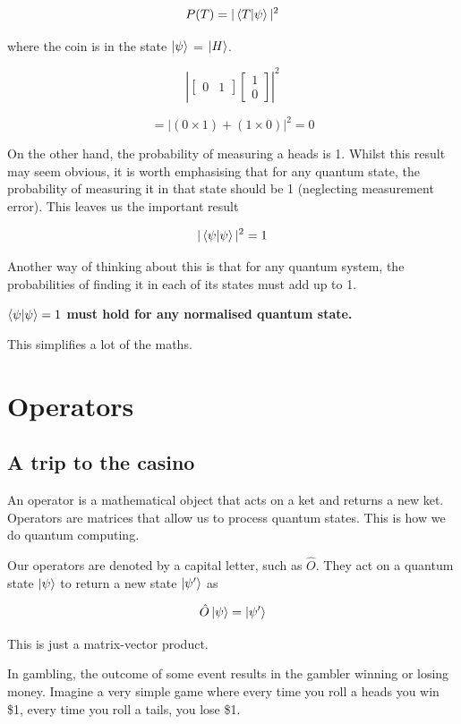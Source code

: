 \documentclass{book}
\begin{document}
$$ P(T) = |\braket{T|\psi}|^2 $$ 

where the coin is in the state $\ket{\psi}$ = $\ket{H}$. 

$$  
\left| \begin{bmatrix} 0 & 1 \end{bmatrix} \begin{bmatrix} 1 \\ 0 \end{bmatrix} \right|^2 
$$

$$
= \left| (0 \times 1) + (1 \times 0) \right|^2 = 0 
$$

On the other hand, the probability of measuring a heads is 1. Whilst this result may seem obvious, it is worth emphasising that for any quantum state, the probability of measuring it in that state should be 1 (neglecting measurement error). This leaves us the important result

$$ |\braket{\psi|\psi}|^2 = 1 $$

Another way of thinking about this is that for any quantum system, the probabilities of finding it in each of its states must add up to 1. 

\textbf{$ \braket{\psi|\psi} = 1 $ must hold for any normalised quantum state.}

This simplifies a lot of the maths. 

\section{ Operators }

\subsection{ A trip to the casino}

An operator is a mathematical object that acts on a ket and returns a new ket. Operators are matrices that allow us to process quantum states. This is how we do quantum computing. 

Our operators are denoted by a capital letter, such as  $\hat{O}$. They act on a quantum state $\ket{\psi}$ to return a new state $\ket{\psi'}$ as 

$$\hat{O}\ket{\psi} = \ket{\psi'}$$

This is just a matrix-vector product. 

In gambling, the outcome of some event results in the gambler winning or losing money. Imagine a very simple game where every time you roll a heads you win \$1, every time you roll a tails, you lose \$1. 
\end{document}
